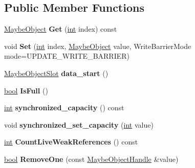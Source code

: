 \subsection*{Public Member Functions}
\begin{DoxyCompactItemize}
\item 
\mbox{\label{classv8_1_1internal_1_1WeakArrayList_ab203c57bb0f9e4f5436bfb8c57d5ee9d}} 
\mbox{\hyperlink{classv8_1_1internal_1_1MaybeObject}{Maybe\+Object}} {\bfseries Get} (\mbox{\hyperlink{classint}{int}} index) const
\item 
\mbox{\label{classv8_1_1internal_1_1WeakArrayList_a64793fef14a8b207a17b5b7ff5956815}} 
void {\bfseries Set} (\mbox{\hyperlink{classint}{int}} index, \mbox{\hyperlink{classv8_1_1internal_1_1MaybeObject}{Maybe\+Object}} value, Write\+Barrier\+Mode mode=U\+P\+D\+A\+T\+E\+\_\+\+W\+R\+I\+T\+E\+\_\+\+B\+A\+R\+R\+I\+ER)
\item 
\mbox{\label{classv8_1_1internal_1_1WeakArrayList_ac9b6767e183b3cddb07f9258059b2723}} 
\mbox{\hyperlink{classv8_1_1internal_1_1MaybeObjectSlot}{Maybe\+Object\+Slot}} {\bfseries data\+\_\+start} ()
\item 
\mbox{\label{classv8_1_1internal_1_1WeakArrayList_aec7b858bbf61de357d2e42d46f993239}} 
\mbox{\hyperlink{classbool}{bool}} {\bfseries Is\+Full} ()
\item 
\mbox{\label{classv8_1_1internal_1_1WeakArrayList_aaf856e131586bb24043aad2816670fc5}} 
\mbox{\hyperlink{classint}{int}} {\bfseries synchronized\+\_\+capacity} () const
\item 
\mbox{\label{classv8_1_1internal_1_1WeakArrayList_a98d20f669e5d05d839621314b7a917f2}} 
void {\bfseries synchronized\+\_\+set\+\_\+capacity} (\mbox{\hyperlink{classint}{int}} value)
\item 
\mbox{\label{classv8_1_1internal_1_1WeakArrayList_a800155cc7dbd8dcf4e0b0769e314173a}} 
\mbox{\hyperlink{classint}{int}} {\bfseries Count\+Live\+Weak\+References} () const
\item 
\mbox{\label{classv8_1_1internal_1_1WeakArrayList_a8b490a085dd0b70cf1d880b5d35058ad}} 
\mbox{\hyperlink{classbool}{bool}} {\bfseries Remove\+One} (const \mbox{\hyperlink{classv8_1_1internal_1_1MaybeObjectHandle}{Maybe\+Object\+Handle}} \&value)
\end{DoxyCompactItemize}

